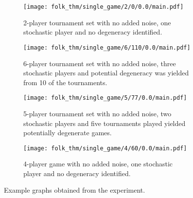 \begin{figure}
    \begin{subfigure}{0.45\textwidth}
        \centering
        \texttt{[image: folk\_thm/single\_game/2/0/0.0/main.pdf]}
        \caption{2-player tournament set with no added noise, one stochastic player and no degeneracy identified.}\label{subfig:clear_thresh_plot}
    \end{subfigure}
    \begin{subfigure}{0.45\textwidth}
        \centering
        \texttt{[image: folk\_thm/single\_game/6/110/0.0/main.pdf]}
        \caption{6-player tournament set with no added noise, three stochastic players and potential degeneracy was yielded from 10 of the tournaments.}\label{subfig:unclear_thresh_plot}
    \end{subfigure}

    \begin{subfigure}{0.45\textwidth}
        \centering
        \texttt{[image: folk\_thm/single\_game/5/77/0.0/main.pdf]}
        \caption{5-player tournament set with no added noise, two stochastic players and five tournaments played yielded potentially degenerate games.}\label{subfig:degenerate_plot}
    \end{subfigure}
    \begin{subfigure}{0.45\textwidth}
        \centering
        \texttt{[image: folk\_thm/single\_game/4/60/0.0/main.pdf]}
        \caption{4-player game with no added noise, one stochastic player and no degeneracy identified.}\label{subfig:constant_plot}
    \end{subfigure}
    \caption{Example graphs obtained from the experiment.}\label{fig:example_graphs}
\end{figure}

